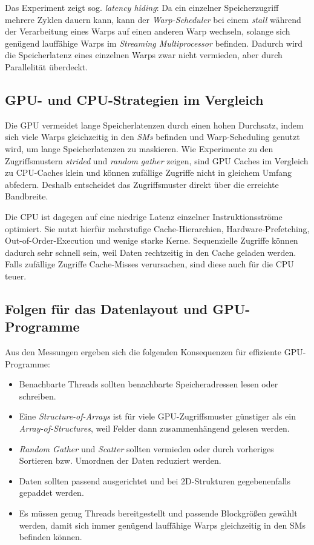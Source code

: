 Das Experiment zeigt sog. \textit{latency hiding}: Da ein einzelner
Speicherzugriff mehrere Zyklen dauern kann, kann der \textit{Warp-Scheduler} bei einem 
\textit{stall} während der Verarbeitung eines Warps auf einen anderen Warp wechseln, 
solange sich genügend lauffähige Warps im \textit{Streaming Multiprocessor} befinden. Dadurch 
wird die Speicherlatenz eines einzelnen Warps zwar nicht vermieden, aber durch 
Parallelität überdeckt.

\subsection{GPU- und CPU-Strategien im Vergleich}

Die GPU vermeidet lange Speicherlatenzen durch einen hohen Durchsatz, indem sich viele 
Warps gleichzeitig in den \textit{SMs} befinden und Warp-Scheduling genutzt wird, um 
lange Speicherlatenzen zu maskieren.
Wie Experimente zu den Zugriffsmustern \textit{strided} und \textit{random gather} zeigen, 
sind GPU Caches im Vergleich zu CPU-Caches klein und können zufällige Zugriffe nicht in 
gleichem Umfang  abfedern. Deshalb entscheidet das Zugriffsmuster direkt über die 
erreichte Bandbreite.

Die CPU ist dagegen auf eine niedrige Latenz einzelner Instruktionsströme
optimiert. Sie nutzt hierfür mehrstufige Cache-Hierarchien, Hardware-Prefetching,
Out-of-Order-Execution und wenige starke Kerne. Sequenzielle Zugriffe
können dadurch sehr schnell sein, weil Daten rechtzeitig in den Cache geladen
werden. Falls zufällige Zugriffe Cache-Misses verursachen, sind diese auch für die CPU 
teuer.

\subsection{Folgen für das Datenlayout und GPU-Programme}

Aus den Messungen ergeben sich die folgenden Konsequenzen für effiziente
GPU-Programme:

\begin{itemize}
  \item Benachbarte Threads sollten benachbarte Speicheradressen lesen oder
        schreiben.
  \item Eine \textit{Structure-of-Arrays} ist für viele GPU-Zugriffsmuster günstiger als
        ein \textit{Array-of-Structures}, weil Felder dann zusammenhängend gelesen werden.
  \item \textit{Random Gather} und \textit{Scatter} sollten vermieden oder durch vorheriges
        Sortieren bzw. Umordnen der Daten reduziert werden.
  \item Daten sollten passend ausgerichtet und bei 2D-Strukturen gegebenenfalls
        gepaddet werden.
  \item Es müssen genug Threads bereitgestellt und passende Blockgrößen gewählt werden,
        damit sich immer genügend lauffähige Warps gleichzeitig in den SMs befinden können.
\end{itemize}

